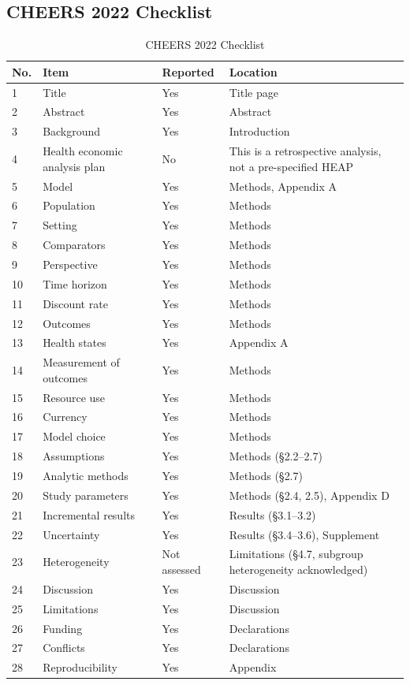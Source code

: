 \documentclass[11pt,a4paper]{article}
\begin{document}
\subsection{CHEERS 2022 Checklist}
\label{sec:cheers}
\begin{table}[H]
\centering
\caption{CHEERS 2022 Checklist}
\label{tab:cheers}
\begin{tabularx}{\linewidth}{@{}p{0.7cm}X p{1.6cm}X@{}}
\toprule
\textbf{No.} & \textbf{Item} & {\scriptsize\textbf{Reported}} & \textbf{Location} \\
\midrule
1 & Title & Yes & Title page \\
2 & Abstract & Yes & Abstract \\
3 & Background & Yes & Introduction \\
4 & Health economic analysis plan & No & This is a retrospective analysis, not a pre-specified HEAP \\
5 & Model & Yes & Methods, Appendix A \\
6 & Population & Yes & Methods \\
7 & Setting & Yes & Methods \\
8 & Comparators & Yes & Methods \\
9 & Perspective & Yes & Methods \\
10 & Time horizon & Yes & Methods \\
11 & Discount rate & Yes & Methods \\
12 & Outcomes & Yes & Methods \\
13 & Health states & Yes & Appendix A \\
14 & Measurement of outcomes & Yes & Methods \\
15 & Resource use & Yes & Methods \\
16 & Currency & Yes & Methods \\
17 & Model choice & Yes & Methods \\
18 & Assumptions & Yes & Methods ({\S}2.2--2.7) \\
19 & Analytic methods & Yes & Methods ({\S}2.7) \\
20 & Study parameters & Yes & Methods ({\S}2.4, 2.5), Appendix D \\
21 & Incremental results & Yes & Results ({\S}3.1--3.2) \\
22 & Uncertainty & Yes & Results ({\S}3.4--3.6), Supplement \\
23 & Heterogeneity & Not assessed & Limitations ({\S}4.7, subgroup heterogeneity acknowledged) \\
24 & Discussion & Yes & Discussion \\
25 & Limitations & Yes & Discussion \\
26 & Funding & Yes & Declarations \\
27 & Conflicts & Yes & Declarations \\
28 & Reproducibility & Yes & Appendix \\
\bottomrule
\end{tabularx}
\end{table}

\newpage

\end{document}
